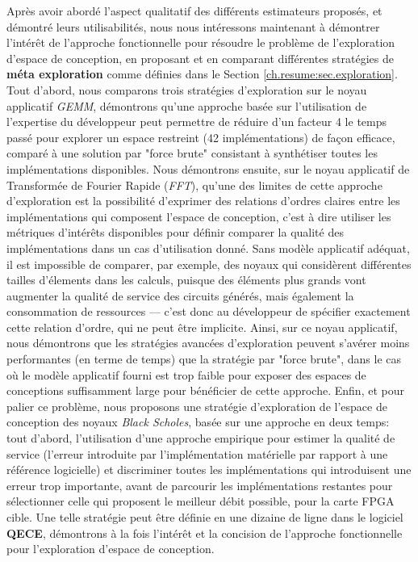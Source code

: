     Après avoir abordé l'aspect qualitatif des différents estimateurs proposés, et démontré leurs utilisabilités, nous nous intéressons maintenant à démontrer l'intérêt de l'approche fonctionnelle pour résoudre le problème de l'exploration d'espace de conception, en proposant et en comparant différentes stratégies de {\bf méta exploration} comme définies dans le Section \ref{ch.resume:sec.exploration}.
    Tout d'abord, nous comparons trois stratégies d'exploration sur le noyau applicatif {\it GEMM}, démontrons qu'une approche basée sur l'utilisation de l'expertise du développeur peut permettre de réduire d'un facteur 4 le temps passé pour explorer un espace restreint (42 implémentations) de façon efficace, comparé à une solution par "force brute" consistant à synthétiser toutes les implémentations disponibles.
    Nous démontrons ensuite, sur le noyau applicatif de Transformée de Fourier Rapide ({\it FFT}), qu'une des limites de cette approche d'exploration est la possibilité d'exprimer des relations d'ordres claires entre les implémentations qui composent l'espace de conception, c'est à dire utiliser les métriques d'intérêts disponibles pour définir comparer la qualité des implémentations dans un cas d'utilisation donné.
    Sans modèle applicatif adéquat, il est impossible de comparer, par exemple, des noyaux qui considèrent différentes tailles d'élements dans les calculs, puisque des éléments plus grands vont augmenter la qualité de service des circuits générés, mais également la consommation de ressources --- c'est donc au développeur de spécifier exactement cette relation d'ordre, qui ne peut être implicite.
    Ainsi, sur ce noyau applicatif, nous démontrons que les stratégies avancées d'exploration peuvent s'avérer moins performantes (en terme de temps) que la stratégie par "force brute", dans le cas où le modèle applicatif fourni est trop faible pour exposer des espaces de conceptions suffisamment large pour bénéficier de cette approche.
   Enfin, et pour palier ce problème, nous proposons une stratégie d'exploration de l'espace de conception des noyaux {\it Black Scholes}, basée sur une approche en deux temps: tout d'abord, l'utilisation d'une approche empirique pour estimer la qualité de service (l'erreur introduite par l'implémentation matérielle par rapport à une référence logicielle) et discriminer toutes les implémentations qui introduisent une erreur trop importante, avant de parcourir les implémentations restantes pour sélectionner celle qui proposent le meilleur débit possible, pour la carte FPGA cible. 
    Une telle stratégie peut être définie en une dizaine de ligne dans le logiciel {\bf QECE}, démontrons à la fois l'intérêt et la concision de l'approche fonctionnelle pour l'exploration d'espace de conception.

